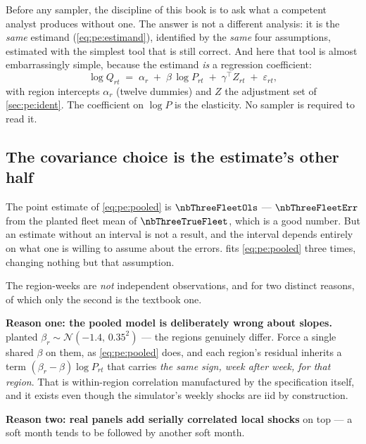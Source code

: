 Before any sampler, the discipline of this book is to ask what a competent analyst produces
without one. The answer is not a different analysis: it is the \emph{same} estimand
(\cref{eq:pe:estimand}), identified by the \emph{same} four assumptions, estimated with the
simplest tool that is still correct. And here that tool is almost embarrassingly simple, because
the estimand \emph{is} a regression coefficient:
%
\begin{equation}
  \log Q_{rt} \;=\; \alpha_r \;+\; \beta\, \log P_{rt} \;+\; \gamma^{\top} Z_{rt}
                \;+\; \varepsilon_{rt},
  \label{eq:pe:pooled}
\end{equation}
%
with region intercepts $\alpha_r$ (twelve dummies) and $Z$ the adjustment set of
\cref{sec:pe:ident}. The coefficient on $\log P$ is the elasticity. No sampler is required to read
it.

\subsection*{The covariance choice is the estimate's other half}

The point estimate of \cref{eq:pe:pooled} is $\nbThreeFleetOls$ --- $\nbThreeFleetErr$ from the
planted fleet mean of $\nbThreeTrueFleet$, which is a good number. But an estimate without an
interval is not a result, and the interval depends entirely on what one is willing to assume about
the errors.  fits \cref{eq:pe:pooled} three times, changing nothing but
that assumption.



The \nbThreeNObs{} region-weeks are \emph{not} independent observations, and for two distinct
reasons, of which only the second is the textbook one.

\textbf{Reason one: the pooled model is deliberately wrong about slopes.}  planted
$\beta_r \sim \mathcal N(-1.4,\, 0.35^2)$ --- the regions genuinely differ. Force a single shared
$\beta$ on them, as \cref{eq:pe:pooled} does, and each region's residual inherits a term
$(\beta_r - \beta)\log P_{rt}$ that carries \emph{the same sign, week after week, for that region}.
That is within-region correlation manufactured by the specification itself, and it exists even
though the simulator's weekly shocks are iid by construction.

\textbf{Reason two: real panels add serially correlated local shocks} on top --- a soft month tends
to be followed by another soft month.

